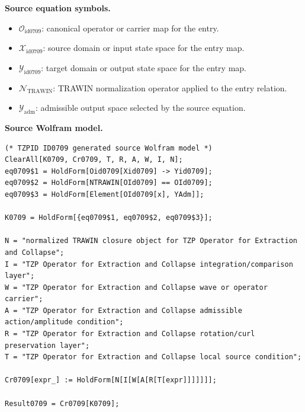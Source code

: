 \begin{minipage}[t]{0.49\linewidth}
\begingroup
\small
\raggedright
\textbf{Source equation symbols.}\par
\begin{itemize}[leftmargin=1.35em,itemsep=1pt,topsep=1pt,parsep=0pt]
    \item $\mathcal{O}_{\mathrm{id0709}}$: canonical operator or carrier map for the entry.
    \item $\mathcal{X}_{\mathrm{id0709}}$: source domain or input state space for the entry map.
    \item $\mathcal{Y}_{\mathrm{id0709}}$: target domain or output state space for the entry map.
    \item $\mathcal{N}_{\mathrm{TRAWIN}}$: TRAWIN normalization operator applied to the entry relation.
    \item $\mathcal{Y}_{\mathrm{adm}}$: admissible output space selected by the source equation.
\end{itemize}
\endgroup
\end{minipage}\hfill
\begin{minipage}[t]{0.47\linewidth}
\begingroup
\scriptsize
\raggedright
\textbf{Source Wolfram model.}\par
\begin{Verbatim}[fontsize=\tiny,breaklines=true,breakanywhere=true]
(* TZPID ID0709 generated source Wolfram model *)
ClearAll[K0709, Cr0709, T, R, A, W, I, N];
eq0709$1 = HoldForm[Oid0709[Xid0709] -> Yid0709];
eq0709$2 = HoldForm[NTRAWIN[OId0709] == OId0709];
eq0709$3 = HoldForm[Element[OId0709[x], YAdm]];

K0709 = HoldForm[{eq0709$1, eq0709$2, eq0709$3}];

N = "normalized TRAWIN closure object for TZP Operator for Extraction and Collapse";
I = "TZP Operator for Extraction and Collapse integration/comparison layer";
W = "TZP Operator for Extraction and Collapse wave or operator carrier";
A = "TZP Operator for Extraction and Collapse admissible action/amplitude condition";
R = "TZP Operator for Extraction and Collapse rotation/curl preservation layer";
T = "TZP Operator for Extraction and Collapse local source condition";

Cr0709[expr_] := HoldForm[N[I[W[A[R[T[expr]]]]]]];

Result0709 = Cr0709[K0709];
\end{Verbatim}
\endgroup
\end{minipage}

